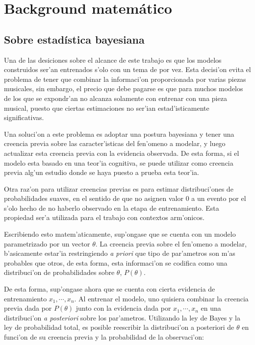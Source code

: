 
\section{Background matem\'atico}
\subsection{Sobre estad\'istica bayesiana}
Una de las desiciones sobre el alcance de este trabajo es que los modelos construidos ser'an entrenados s'olo con un tema de por vez. 
Esta decisi'on evita el problema de tener que combinar la informaci'on proporcionada por varias piezas musicales, sin embargo, el precio que debe pagarse 
es que para muchos modelos de los que se expondr'an no alcanza solamente con entrenar con una pieza musical, puesto que ciertas estimaciones no ser'ian estad'isticamente 
significativas. 

Una soluci'on a este problema es adoptar una postura bayesiana y tener una creencia previa sobre las caracter'isticas del fen'omeno a modelar, 
y luego actualizar esta creencia previa con la evidencia observada. De esta forma, si el modelo esta basado en una teor'ia cognitiva, se puede utilizar
como creencia previa alg'un estudio donde se haya puesto a prueba esta teor'ia. 

Otra raz'on para utilizar creencias previas es para estimar distribuci'ones de probabilidades suaves, en el sentido de que no asignen valor $0$ a un evento 
por el s'olo hecho de no haberlo observado en la etapa de entrenamiento. Esta propiedad ser'a utilizada para el trabajo con contextos arm'onicos.

Escribiendo esto matem'aticamente, sup'ongase que se cuenta con un modelo parametrizado por un vector $\theta$. 
La creencia previa sobre el fen'omeno a modelar, b'asicamente estar'ia restringiendo \emph{a priori} que tipo de par'ametros son m'as probables que otros, 
de esta forma, esta informaci'on se codifica como una distribuci'on de probabilidades sobre $\theta$, $P(\theta)$. 

De esta forma, sup'ongase ahora que se cuenta con cierta evidencia de entrenamiento $x_1,\cdots,x_n$. Al entrenar el modelo, uno quisiera combinar la 
creencia previa dada por $P(\theta)$ junto con la evidencia dada por $x_1,\cdots,x_n$ en una distribuci'on \emph{a posteriori} sobre los par'ametros.
Utilizando la ley de Bayes y la ley de probabilidad total, es posible reescribir la distribuci'on a posteriori de $\theta$ en funci'on de su creencia previa y 
la probabilidad de la observaci'on:

